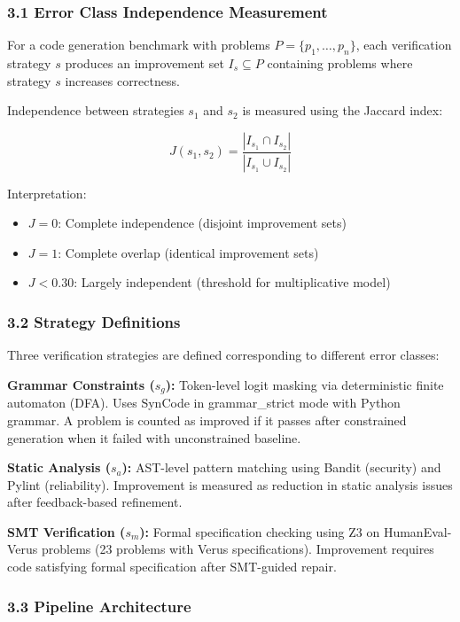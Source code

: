 
\subsubsection{3.1 Error Class Independence Measurement}

For a code generation benchmark with problems $P = \{p_1, \ldots, p_n\}$, each verification strategy $s$ produces an improvement set $I_s \subseteq P$ containing problems where strategy $s$ increases correctness.

Independence between strategies $s_1$ and $s_2$ is measured using the Jaccard index:

$$J(s_1, s_2) = \frac{|I_{s_1} \cap I_{s_2}|}{|I_{s_1} \cup I_{s_2}|}$$

Interpretation:
\begin{itemize}
\item $J = 0$: Complete independence (disjoint improvement sets)
\item $J = 1$: Complete overlap (identical improvement sets)
\item $J < 0.30$: Largely independent (threshold for multiplicative model)
\end{itemize}

\subsubsection{3.2 Strategy Definitions}

Three verification strategies are defined corresponding to different error classes:

\textbf{Grammar Constraints ($s_g$):} Token-level logit masking via deterministic finite automaton (DFA). Uses SynCode in grammar\_strict mode with Python grammar. A problem is counted as improved if it passes after constrained generation when it failed with unconstrained baseline.

\textbf{Static Analysis ($s_a$):} AST-level pattern matching using Bandit (security) and Pylint (reliability). Improvement is measured as reduction in static analysis issues after feedback-based refinement.

\textbf{SMT Verification ($s_m$):} Formal specification checking using Z3 on HumanEval-Verus problems (23 problems with Verus specifications). Improvement requires code satisfying formal specification after SMT-guided repair.

\subsubsection{3.3 Pipeline Architecture}

